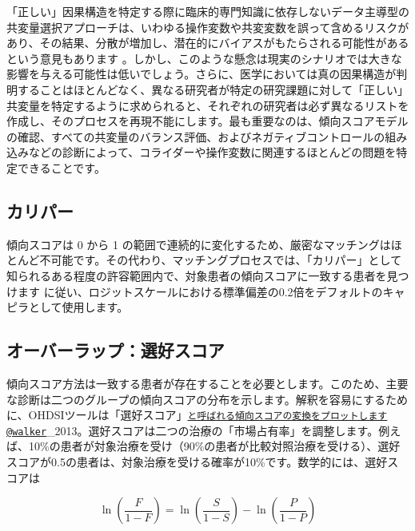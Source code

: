 \documentclass[
  11pt]{book}
\theoremstyle{definition}
\theoremstyle{definition}
\theoremstyle{definition}
\theoremstyle{definition}
\theoremstyle{remark}
\begin{document}
「正しい」因果構造を特定する際に臨床的専門知識に依存しないデータ主導型の共変量選択アプローチは、いわゆる操作変数や共変変数を誤って含めるリスクがあり、その結果、分散が増加し、潜在的にバイアスがもたらされる可能性があるという意見もあります \citep{hernan_2002}。しかし、このような懸念は現実のシナリオでは大きな影響を与える可能性は低いでしょう\citep{schneeweiss_2018}。さらに、医学においては真の因果構造が判明することはほとんどなく、異なる研究者が特定の研究課題に対して「正しい」共変量を特定するように求められると、それぞれの研究者は必ず異なるリストを作成し、そのプロセスを再現不能にします。最も重要なのは、傾向スコアモデルの確認、すべての共変量のバランス評価、およびネガティブコントロールの組み込みなどの診断によって、コライダーや操作変数に関連するほとんどの問題を特定できることです。  

\subsection{カリパー}\label{ux30abux30eaux30d1ux30fc}


傾向スコアは 0 から 1 の範囲で連続的に変化するため、厳密なマッチングはほとんど不可能です。その代わり、マッチングプロセスでは、「カリパー」として知られるある程度の許容範囲内で、対象患者の傾向スコアに一致する患者を見つけます \citet{austin_2011} に従い、ロジットスケールにおける標準偏差の0.2倍をデフォルトのキャピラとして使用します。

\subsection{オーバーラップ：選好スコア}\label{ux30aaux30fcux30d0ux30fcux30e9ux30c3ux30d7ux9078ux597dux30b9ux30b3ux30a2}


傾向スコア方法は一致する患者が存在することを必要とします。このため、主要な診断は二つのグループの傾向スコアの分布を示します。解釈を容易にするために、OHDSIツールは「選好スコア」\href{mailto:と呼ばれる傾向スコアの変換をプロットします@walker}{\nolinkurl{と呼ばれる傾向スコアの変換をプロットします@walker}}\_2013。選好スコアは二つの治療の「市場占有率」を調整します。例えば、10\%の患者が対象治療を受け（90\%の患者が比較対照治療を受ける）、選好スコアが0.5の患者は、対象治療を受ける確率が10\%です。数学的には、選好スコアは

\[\ln\left(\frac{F}{1-F}\right)=\ln\left(\frac{S}{1-S}\right)-\ln\left(\frac{P}{1-P}\right)\]
\end{document}
